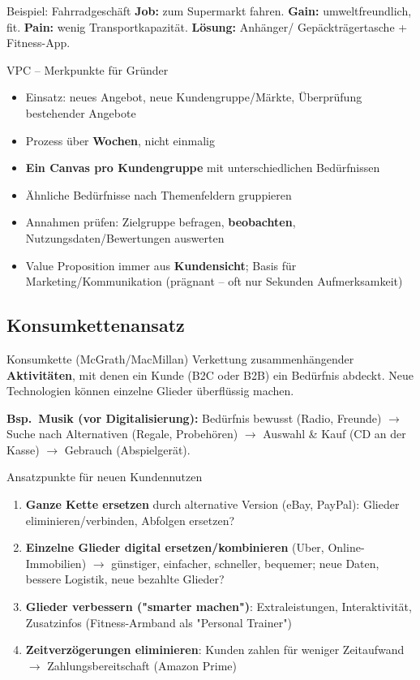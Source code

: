 \documentclass[a4paper, fontsize=7pt]{scrartcl}
\begin{document}
\begin{subbox}{Beispiel: Fahrradgeschäft}
\textbf{Job:} zum Supermarkt fahren. \textbf{Gain:} umweltfreundlich, fit.
\textbf{Pain:} wenig Transportkapazität. \textbf{Lösung:} Anhänger/
Gepäckträgertasche + Fitness-App.
\end{subbox}

\begin{subbox}{VPC -- Merkpunkte für Gründer}
\begin{itemize}
    \item Einsatz: neues Angebot, neue Kundengruppe/Märkte, Überprüfung
    bestehender Angebote
    \item Prozess über \textbf{Wochen}, nicht einmalig
    \item \textbf{Ein Canvas pro Kundengruppe} mit unterschiedlichen
    Bedürfnissen
    \item Ähnliche Bedürfnisse nach Themenfeldern gruppieren
    \item Annahmen prüfen: Zielgruppe befragen, \textbf{beobachten},
    Nutzungsdaten/Bewertungen auswerten
    \item Value Proposition immer aus \textbf{Kundensicht}; Basis für
    Marketing/Kommunikation (prägnant -- oft nur Sekunden Aufmerksamkeit)
\end{itemize}
\end{subbox}

\subsection{Konsumkettenansatz}

\begin{mainbox}{Konsumkette (McGrath/MacMillan)}
Verkettung zusammenhängender \textbf{Aktivitäten}, mit denen ein Kunde (B2C oder
B2B) ein Bedürfnis abdeckt. Neue Technologien können einzelne Glieder
überflüssig machen.

\textbf{Bsp.\ Musik (vor Digitalisierung):} Bedürfnis bewusst (Radio,
Freunde) $\to$ Suche nach Alternativen (Regale, Probehören) $\to$ Auswahl \&
Kauf (CD an der Kasse) $\to$ Gebrauch (Abspielgerät).
\end{mainbox}

\begin{mainbox}{Ansatzpunkte für neuen Kundennutzen}
\begin{enumerate}
    \item \textbf{Ganze Kette ersetzen} durch alternative Version (eBay,
    PayPal): Glieder eliminieren/verbinden, Abfolgen ersetzen?
    \item \textbf{Einzelne Glieder digital ersetzen/kombinieren} (Uber,
    Online-Immobilien) $\to$ günstiger, einfacher, schneller, bequemer;
    neue Daten, bessere Logistik, neue bezahlte Glieder?
    \item \textbf{Glieder verbessern ("smarter machen")}: Extraleistungen,
    Interaktivität, Zusatzinfos (Fitness-Armband als "Personal Trainer")
    \item \textbf{Zeitverzögerungen eliminieren}: Kunden zahlen für weniger
    Zeitaufwand $\to$ Zahlungsbereitschaft (Amazon Prime)
\end{enumerate}
\end{mainbox}
\end{document}
